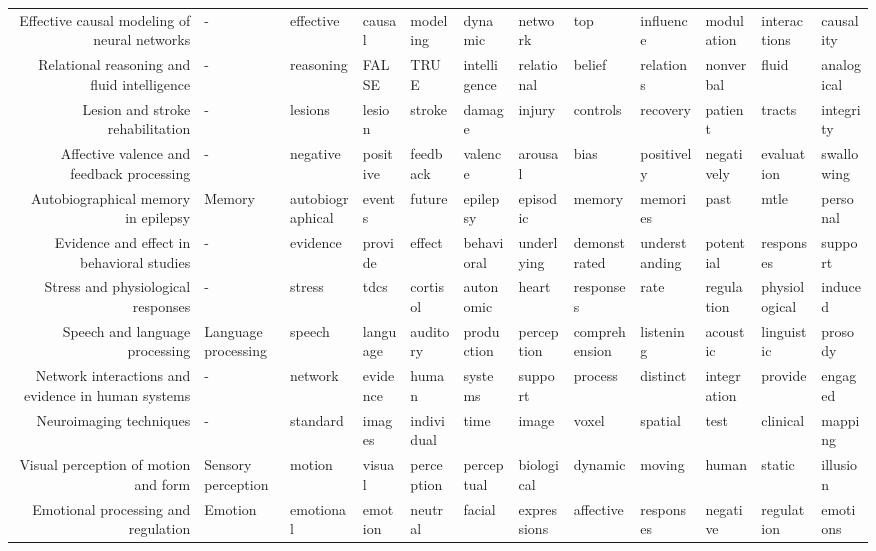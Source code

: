 \documentclass[english]{article}
\begin{document}
\begin{landscape}
\begin{supertabular}{rlllllllllll}
Effective causal modeling of neural networks &                   - &        effective &        causal &        modeling &        dynamic &     network &            top &     influence &     modulation &  interactions &      causality \\
Relational reasoning and fluid intelligence &                   - &        reasoning &         FALSE &            TRUE &   intelligence &  relational &         belief &     relations &      nonverbal &         fluid &     analogical \\
    Lesion and stroke rehabilitation &                   - &          lesions &        lesion &          stroke &         damage &      injury &       controls &      recovery &        patient &        tracts &      integrity \\
Affective valence and feedback processing &                   - &         negative &      positive &        feedback &        valence &     arousal &           bias &    positively &     negatively &    evaluation &     swallowing \\
 Autobiographical memory in epilepsy &              Memory & autobiographical &        events &          future &       epilepsy &    episodic &         memory &      memories &           past &          mtle &       personal \\
Evidence and effect in behavioral studies &                   - &         evidence &       provide &          effect &     behavioral &  underlying &   demonstrated & understanding &      potential &     responses &        support \\
  Stress and physiological responses &                   - &           stress &          tdcs &        cortisol &      autonomic &       heart &      responses &          rate &     regulation & physiological &        induced \\
      Speech and language processing & Language processing &           speech &      language &        auditory &     production &  perception &  comprehension &     listening &       acoustic &    linguistic &        prosody \\
Network interactions and evidence in human systems &                   - &          network &      evidence &           human &        systems &     support &        process &      distinct &    integration &       provide &        engaged \\
             Neuroimaging techniques &                   - &         standard &        images &      individual &           time &       image &          voxel &       spatial &           test &      clinical &        mapping \\
Visual perception of motion and form &  Sensory perception &           motion &        visual &      perception &     perceptual &  biological &        dynamic &        moving &          human &        static &       illusion \\
 Emotional processing and regulation &             Emotion &        emotional &       emotion &         neutral &         facial & expressions &      affective &     responses &       negative &    regulation &       emotions \\


\end{supertabular}
\end{landscape}
\end{document}

